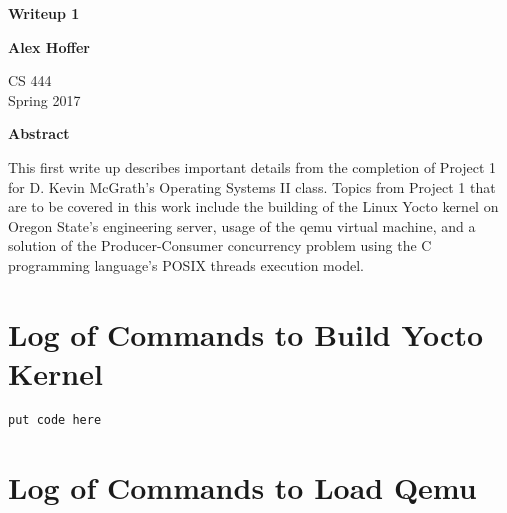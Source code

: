 \documentclass[letterpaper,10pt,titlepage]{article}
\begin{document}
\begin{titlepage}
    \begin{center}
        \vspace*{3.5cm}

        \textbf{Writeup 1}

        \vspace{0.5cm}

        \textbf{Alex Hoffer}

        \vspace{0.8cm}

        CS 444\\
        Spring 2017\\

        \vspace{1cm}

        \textbf{Abstract}\\

        \vspace{0.5cm}

        This first write up describes important details from the completion of Project 1 for D. Kevin McGrath's Operating Systems II class. Topics from Project 1 that are to be covered in this work include the building of the Linux Yocto kernel on Oregon State's engineering server, usage of the qemu virtual machine, and a solution of the Producer-Consumer concurrency problem using the C programming language's POSIX threads execution model. 

        \vfill

    \end{center}
\end{titlepage}

\newpage

\tableofcontents

\newpage



\section{Log of Commands to Build Yocto Kernel}
\begin{lstlisting}
put code here
\end{lstlisting}

\section{Log of Commands to Load Qemu}
\end{document}
